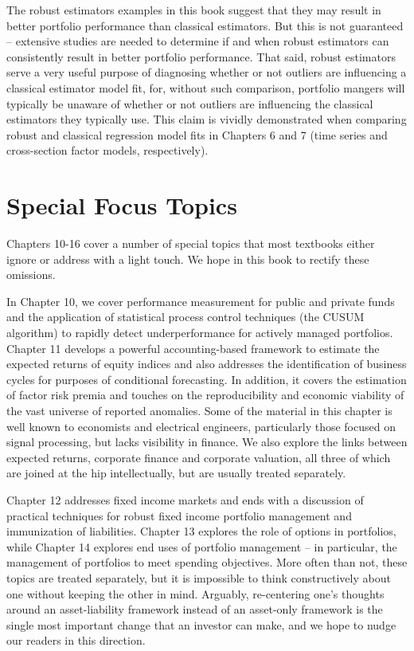 \documentclass[graybox,envcountchap,sectrefs]{svmono}\usepackage[]{graphicx}\usepackage[]{xcolor}
\begin{document}
The robust estimators examples in this book suggest that they may
result in better portfolio performance than classical estimators.
But this is not guaranteed -- extensive studies are needed to determine
if and when robust estimators can consistently result in better portfolio
performance. That said, robust estimators serve a very useful purpose
of diagnosing whether or not outliers are influencing a classical
estimator model fit, for, without such comparison, portfolio mangers
will typically be unaware of whether or not outliers are influencing
the classical estimators they typically use. This claim is vividly
demonstrated when comparing robust and classical regression model
fits in Chapters 6 and 7 (time series and cross-section factor models,
respectively).

\section*{Special Focus Topics}

Chapters 10-16 cover a number of special topics that most textbooks
either ignore or address with a light touch. We hope in this book
to rectify these omissions.

In Chapter 10, we cover performance measurement for public and private
funds and the application of statistical process control techniques
(the CUSUM algorithm) to rapidly detect underperformance for actively
managed portfolios. Chapter 11 develops a powerful accounting-based
framework to estimate the expected returns of equity indices and also
addresses the identification of business cycles for purposes of conditional
forecasting. In addition, it covers the estimation of factor risk
premia and touches on the reproducibility and economic viability of
the vast universe of reported anomalies. Some of the material in this
chapter is well known to economists and electrical engineers, particularly
those focused on signal processing, but lacks visibility in finance.
We also explore the links between expected returns, corporate finance
and corporate valuation, all three of which are joined at the hip
intellectually, but are usually treated separately.

Chapter 12 addresses fixed income markets and ends with a discussion
of practical techniques for robust fixed income portfolio management
and immunization of liabilities. Chapter 13 explores the role of options
in portfolios, while Chapter 14 explores end uses of portfolio management
-- in particular, the management of portfolios to meet spending objectives.
More often than not, these topics are treated separately, but it is
impossible to think constructively about one without keeping the other
in mind. Arguably, re-centering one's thoughts around an asset-liability
framework instead of an asset-only framework is the single most important
change that an investor can make, and we hope to nudge our readers
in this direction.
\end{document}
